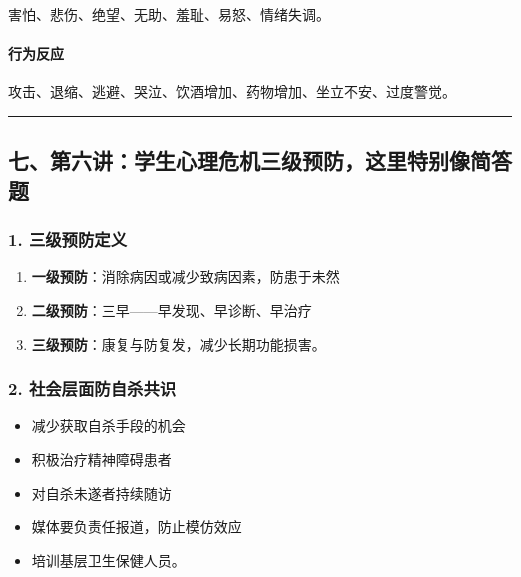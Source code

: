 \documentclass[
  a4paper,
]{ctexart}
\providecommand{\tightlist}{%
  \setlength{\itemsep}{0pt}\setlength{\parskip}{0pt}}
\begin{document}
害怕、悲伤、绝望、无助、羞耻、易怒、情绪失调。

\paragraph{行为反应}\label{ux884cux4e3aux53cdux5e94}

攻击、退缩、逃避、哭泣、饮酒增加、药物增加、坐立不安、过度警觉。

\begin{center}\rule{0.5\linewidth}{0.5pt}\end{center}

\subsection{七、第六讲：学生心理危机三级预防，这里特别像简答题}\label{ux4e03ux7b2cux516dux8bb2ux5b66ux751fux5fc3ux7406ux5371ux673aux4e09ux7ea7ux9884ux9632ux8fd9ux91ccux7279ux522bux50cfux7b80ux7b54ux9898}

\subsubsection{1.
三级预防定义}\label{ux4e09ux7ea7ux9884ux9632ux5b9aux4e49}

\begin{enumerate}
\def\labelenumi{\arabic{enumi}.}
\tightlist
\item
  \textbf{一级预防}：消除病因或减少致病因素，防患于未然
\item
  \textbf{二级预防}：三早------早发现、早诊断、早治疗
\item
  \textbf{三级预防}：康复与防复发，减少长期功能损害。
\end{enumerate}

\subsubsection{2.
社会层面防自杀共识}\label{ux793eux4f1aux5c42ux9762ux9632ux81eaux6740ux5171ux8bc6}

\begin{itemize}
\tightlist
\item
  减少获取自杀手段的机会
\item
  积极治疗精神障碍患者
\item
  对自杀未遂者持续随访
\item
  媒体要负责任报道，防止模仿效应
\item
  培训基层卫生保健人员。
\end{itemize}
\end{document}
